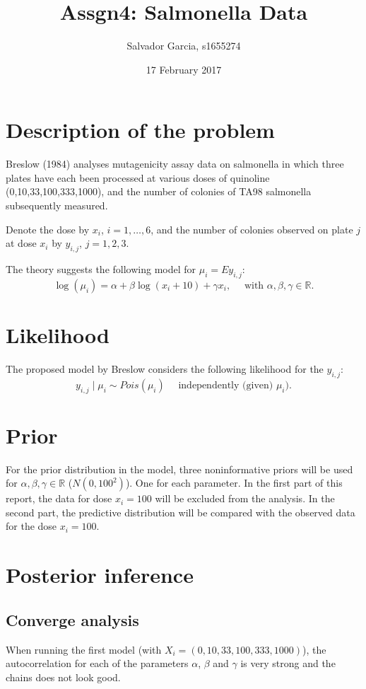 \documentclass{article}
\author{Salvador Garcia, s1655274}
\date{17 February 2017}
\title{Assgn4: Salmonella Data}
\begin{document}
\maketitle
\section{Description of the problem} 
  

\vspace{0.3cm}

Breslow (1984) analyses mutagenicity assay data on salmonella in which three plates have each been processed at various doses of quinoline (0,10,33,100,333,1000),  and the number of  colonies of TA98 salmonella subsequently measured.

\vspace{0.1cm}

Denote the dose by $x_i$, $i=1,\ldots,6$, and the number of colonies observed on plate $j$ at dose $x_i$ by $y_{i,j}$, $j=1,2,3$.

The theory suggests the following model for $\mu_{i} = E y_{i,j}$:
$$
\log (\mu_i) = \alpha + \beta \log(x_i + 10) + \gamma x_i, \quad \text{ with } \alpha,\beta,\gamma \in \mathbb{R}.
$$

\section{Likelihood}

The proposed model by Breslow considers the following likelihood for the $y_{i,j}$:
$$
y_{i,j} \mid \mu_i \sim Pois(\mu_i) \quad \text{ independently (given) } \mu_i ).
$$

\section{Prior}
For the prior distribution in the model, three noninformative priors will be used for $\alpha,\beta,\gamma \in \mathbb{R}$ ($N(0, 100^2)$). One for each parameter. In the first part of this report, the data for dose $x_i = 100$ will be excluded from the analysis. In the second part, the predictive distribution will be compared with the observed data for the dose $x_i = 100$. 


\section{Posterior inference}

\subsection{Converge analysis}
When running the first model (with $X_i = (0,10,33,100,333,1000)$), the autocorrelation for each of the parameters $\alpha$, $\beta$ and $\gamma$ is very strong and the chains does not look good. 
\end{document}
